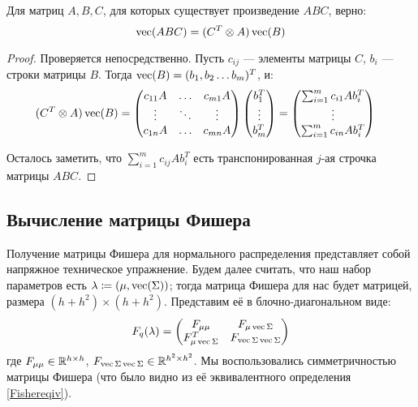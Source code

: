 \begin{theorem}Для матриц $A, B, C$, для которых существует произведение $ABC$, верно:
\begin{equation}\label{kronecker_vect}
\operatorname{vec} (ABC) = (C^T \otimes A)\operatorname{vec}(B)
\end{equation}
\begin{proof} Проверяется непосредственно. Пусть $c_{ij}$ --- элементы матрицы $C$, $b_i$ --- строки матрицы $B$. Тогда $\operatorname{vec}(B) = (b_1, b_2 \dots b_m)^T$, и:
\begin{align*}(C^T \otimes A)\operatorname{vec}(B) &=
\begin{pmatrix}
c_{11}A & \dots & c_{m1}A \\
\vdots & \ddots & \vdots \\
c_{1n}A & \dots & c_{mn}A
\end{pmatrix}
\begin{pmatrix}
b_1^T \\
\vdots\\
b_m^T
\end{pmatrix}
=
\begin{pmatrix}
\sum_{i=1}^{m} c_{i1}Ab_i^T \\
\vdots \\
\sum_{i=1}^{m} c_{in}Ab_i^T \\
\end{pmatrix}
\end{align*}

Осталось заметить, что $\sum_{i=1}^{m} c_{ij}Ab_i^T$ есть транспонированная $j$-ая строчка матрицы $ABC$.

\end{proof}
\end{theorem}

\subsection{Вычисление матрицы Фишера}

Получение матрицы Фишера для нормального распределения представляет собой напряжное техническое упражнение. Будем далее считать, что наш набор параметров есть $\lambda \coloneqq (\mu, \operatorname{vec}(\Sigma))$; тогда матрица Фишера для нас будет матрицей, размера $(h + h^2) \times (h + h^2)$. Представим её в блочно-диагональном виде:
$$F_q(\lambda) =
\begin{pmatrix}
F_{\mu \mu} & F_{\mu \operatorname{vec}{\Sigma}} \\
F_{\mu \operatorname{vec}{\Sigma}}^T & F_{\operatorname{vec}{\Sigma} \operatorname{vec}{\Sigma}}
\end{pmatrix}
$$
где $F_{\mu \mu} \in \mathbb{R}^{h \times h}$, $F_{\operatorname{vec}{\Sigma} \operatorname{vec}{\Sigma}} \in \mathbb{R}^{h^2 \times h^2}$. Мы воспользовались симметричностью матрицы Фишера (что было видно из её эквивалентного определения \eqref{Fishereqiv}).

